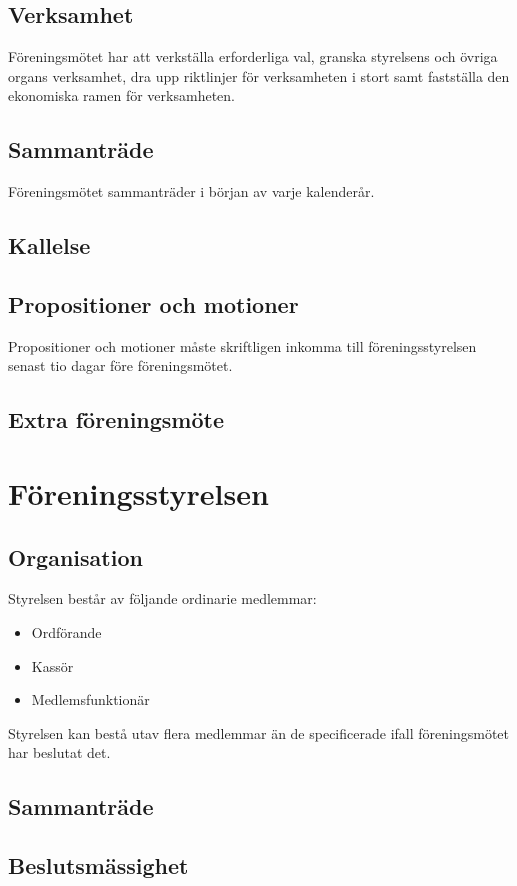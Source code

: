 \documentclass{article}
\begin{document}
\subsection{Verksamhet}
Föreningsmötet har att verkställa erforderliga val, granska styrelsens och övriga
organs verksamhet, dra upp riktlinjer för verksamheten i stort samt fastställa
den ekonomiska ramen för verksamheten.
\subsection{Sammanträde}
Föreningsmötet sammanträder i början av varje kalenderår.
\subsection{Kallelse}
\subsection{Propositioner och motioner}
Propositioner och motioner måste skriftligen inkomma till föreningsstyrelsen
senast tio dagar före föreningsmötet.
\subsection{Extra föreningsmöte}


\section{Föreningsstyrelsen}
\subsection{Organisation}
Styrelsen består av följande ordinarie medlemmar:
\begin{itemize}
  \item Ordförande
  \item Kassör
  \item Medlemsfunktionär
\end{itemize}
Styrelsen kan bestå utav flera medlemmar än de specificerade ifall föreningsmötet har
beslutat det.

\subsection{Sammanträde}

\subsection{Beslutsmässighet}
\end{document}
